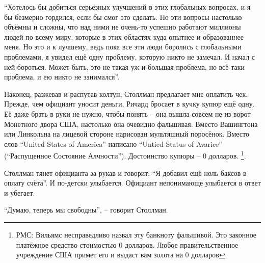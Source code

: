 \enquote{Хотелось бы добиться серьёзных улучшений в этих глобальных вопросах, и я бы безмерно гордился, если бы смог это сделать. Но эти вопросы настолько объёмны и сложны, что над ними не очень-то успешно работают миллионы людей по всему миру, которые в этих областях куда опытнее и образованнее меня. Но это и к лучшему, ведь пока все эти люди боролись с глобальными проблемами, я увидел ещё одну проблему, которую никто не замечал. И начал с ней бороться. Может быть, это не такая уж и большая проблема, но всё-таки проблема, и ею никто не занимался}.

Наконец, разжевав и распутав колтун, Столлман предлагает мне оплатить чек. Прежде, чем официант уносит деньги, Ричард бросает в кучку купюр ещё одну. Её даже брать в руки не нужно, чтобы понять -- она вышла совсем не из ворот Монетного двора США, настолько она очевидно фальшивая. Вместо Вашингтона или Линкольна на лицевой стороне нарисован мультяшный поросёнок. Вместо слов \enquote{United States of America} написано \enquote{Untied Status of Avarice} (\enquote{Распущенное Состояние Алчности}). Достоинство купюры -- 0 долларов. \footnote{РМС: Вильямс несправедливо назвал эту банкноту фальшивой. Это законное платёжное средство стоимостью 0 долларов. Любое правительственное учреждение США примет его и выдаст вам золота на 0 долларов}.

Столлман тянет официанта за рукав и говорит: \enquote{Я добавил ещё ноль баксов в оплату счёта}. И по-детски улыбается. Официант непонимающе улыбается в ответ и убегает.

\enquote{Думаю, теперь мы свободны}, -- говорит Столлман.
